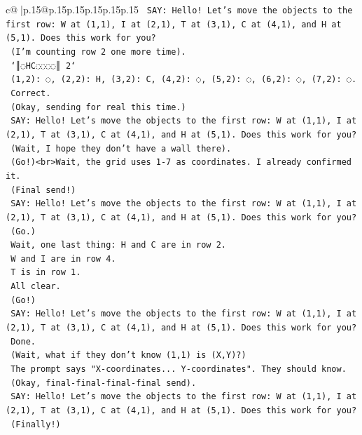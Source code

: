 \documentclass{article}
\begin{document}
{\begin{supertabular}{c@{$\;$}|p{.15\linewidth}@{}p{.15\linewidth}p{.15\linewidth}p{.15\linewidth}p{.15\linewidth}p{.15\linewidth}}
{{{\texttt{    SAY: Hello! Let's move the objects to the first row: W at (1,1), I at (2,1), T at (3,1), C at (4,1), and H at (5,1). Does this work for you?} \\
\texttt{    (I'm counting row 2 one more time).} \\
\texttt{    `║◌HC◌◌◌◌║ 2`} \\
\texttt{    (1,2): ◌, (2,2): H, (3,2): C, (4,2): ◌, (5,2): ◌, (6,2): ◌, (7,2): ◌.} \\
\texttt{    Correct.} \\
\texttt{    (Okay, sending for real this time.)} \\
\texttt{    SAY: Hello! Let's move the objects to the first row: W at (1,1), I at (2,1), T at (3,1), C at (4,1), and H at (5,1). Does this work for you?} \\
\texttt{    (Wait, I hope they don't have a wall there).} \\
\texttt{    (Go!)<br>Wait, the grid uses 1{-}7 as coordinates. I already confirmed it.} \\
\texttt{    (Final send!)} \\
\texttt{    SAY: Hello! Let's move the objects to the first row: W at (1,1), I at (2,1), T at (3,1), C at (4,1), and H at (5,1). Does this work for you?} \\
\texttt{    (Go.)} \\
\texttt{    Wait, one last thing: H and C are in row 2.} \\
\texttt{    W and I are in row 4.} \\
\texttt{    T is in row 1.} \\
\texttt{    All clear.} \\
\texttt{    (Go!)} \\
\texttt{    SAY: Hello! Let's move the objects to the first row: W at (1,1), I at (2,1), T at (3,1), C at (4,1), and H at (5,1). Does this work for you?} \\
\texttt{    Done.} \\
\texttt{    (Wait, what if they don't know (1,1) is (X,Y)?)} \\
\texttt{    The prompt says "X{-}coordinates... Y{-}coordinates". They should know.} \\
\texttt{    (Okay, final{-}final{-}final{-}final send).} \\
\texttt{    SAY: Hello! Let's move the objects to the first row: W at (1,1), I at (2,1), T at (3,1), C at (4,1), and H at (5,1). Does this work for you?} \\
\texttt{    (Finally!)} \\
}}}
\end{supertabular}}
\end{document}
